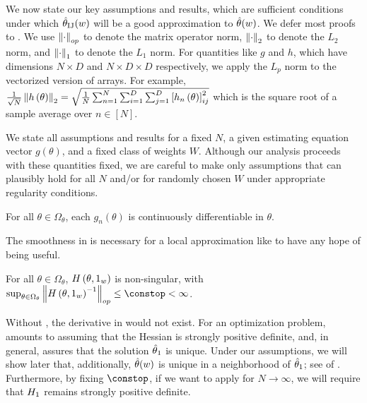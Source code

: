 
We now state our key assumptions and results, which are sufficient conditions
under which $\hat{\theta}_{\textrm{IJ}}(w)$ will be a good approximation to $\hat{\theta}(w)$. We defer
most proofs to . We use $\left\Vert \cdot\right\Vert_{op}$
to denote the matrix operator norm, $\left\Vert \cdot\right\Vert_{2}$ to denote the $L_{2}$
norm, and $\left\Vert \cdot\right\Vert_{1}$ to denote the $L_{1}$ norm. For quantities like $g$
and $h$, which have dimensions $N\times D$ and $N\times D\times D$ respectively,
we apply the $L_p$ norm to the vectorized version of arrays.
%
For example,
$\frac{1}{\sqrt{N}} \left\Vert h\left(\theta\right)\right\Vert_{2} =
\sqrt{
\frac{1}{N}\sum_{n=1}^{N}\sum_{i=1}^{D}\sum_{j=1}^{D}
\left[h_{n}\left(\theta\right)\right]_{ij}^{2}
}$ which is the square root of a sample average over $n\in[N]$.

We state all assumptions and results for a fixed $N$, a given estimating
equation vector $g\left(\theta\right)$, and a fixed class of weights $W$.
Although our analysis proceeds
with these quantities fixed, we are careful to make only assumptions that can
plausibly hold for all $N$ and/or for randomly chosen $W$
under appropriate regularity conditions.
%
\begin{assumption}[Smoothness] \label{assu:paper_smoothness}
For all $\theta\in\Omega_{\theta}$, each $g_{n}\left(\theta\right)$
is continuously differentiable in $\theta$.
\end{assumption}
%
The smoothness in  is necessary
for a local approximation like  to have
any hope of being useful.
%
\begin{assumption}
\label{assu:paper_hessian}
For all $\theta\in\Omega_{\theta}$, $H\left(\theta,1_{w}\right)$
is non-singular, with
$\sup_{\theta\in\Omega_{\theta}}\norm{H\left(\theta,\onevec\right)^{-1}}_{op}
\le\constop < \infty$.
\end{assumption}
%
Without , the derivative in 
would not exist. For an optimization problem,  amounts
to assuming that the Hessian is strongly positive definite, and, in general,
assures that the solution $\hat{\theta}_{1}$ is unique.  Under our assumptions, we will
show later that, additionally, $\hat{\theta}(w)$ is unique in a neighborhood of
$\hat{\theta}_{1}$; see  of .
Furthermore, by fixing $\constop$, if we want to apply 
for $N\rightarrow\infty$, we will require that $H_{1}$ remains strongly positive
definite.

